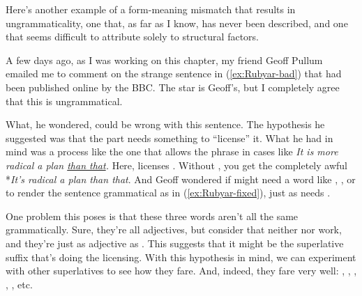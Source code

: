 Here's another example of a form-meaning mismatch that results in ungrammaticality, one that, as far as I know, has never been described, and one that seems difficult to attribute solely to structural factors.

A few days ago, as I was working on this chapter, my friend Geoff Pullum emailed me to comment on the strange sentence in (\ref{ex:Rubyar-bad}) that had been published online by the BBC. The star is Geoff's, but I completely agree that this is ungrammatical.

\label{ex:Rubyar-bad}
\z

What, he wondered, could be wrong with this sentence. The hypothesis he suggested was that the  part needs something to \enquote{license} it. What he had in mind was a process like the one that allows the  phrase in cases like \textit{It is more radical a plan \uline{than that}.} Here,  licenses . Without , you get the completely awful *\textit{It's radical a plan than that}. And Geoff wondered if  might need a word like , , or  to render the sentence grammatical as in (\ref{ex:Rubyar-fixed}), just as  needs .

\ea \label{ex:Rubyar-fixed}
    \z
\z

One problem this poses is that these three words aren't all the same grammatically. Sure, they're all adjectives, but consider that neither  nor  work, and they're just as adjective as . This suggests that it might be the superlative suffix  that's doing the licensing. With this hypothesis in mind, we can experiment with other superlatives to see how they fare. And, indeed, they fare very well: , , , , , etc.

